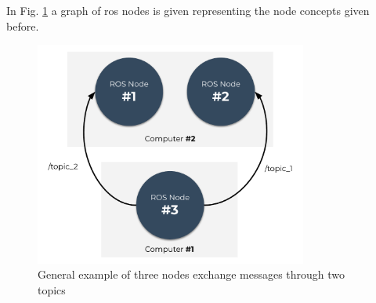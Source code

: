 In Fig. \ref{fig:background:ros_nodes} a graph of \ac{ros} nodes is given representing the node concepts given before.

\begin{figure}[H]
    \centering
    \includegraphics[width=0.8\textwidth]{background/figures/ros_nodes.pdf}
    \caption{General example of three nodes exchange messages through two topics}
    \label{fig:background:ros_nodes}
\end{figure}


